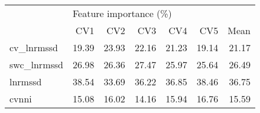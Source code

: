 \begin{tabular}{lrrrrrr}
\toprule
{} & \multicolumn{6}{l}{Feature importance (\%)} \\
{} &                    CV1 &    CV2 &    CV3 &    CV4 &    CV5 &   Mean \\
\midrule
cv\_lnrmssd  &                  19.39 &  23.93 &  22.16 &  21.23 &  19.14 &  21.17 \\
swc\_lnrmssd &                  26.98 &  26.36 &  27.47 &  25.97 &  25.64 &  26.49 \\
lnrmssd     &                  38.54 &  33.69 &  36.22 &  36.85 &  38.46 &  36.75 \\
cvnni       &                  15.08 &  16.02 &  14.16 &  15.94 &  16.76 &  15.59 \\
\bottomrule
\end{tabular}
